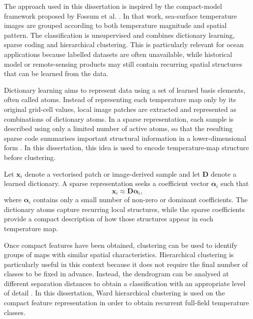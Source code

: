 The approach used in this dissertation is inspired by the compact-model framework proposed by Fossum et al. \cite{fossum2020compact}. In that work, sea-surface temperature images are grouped according to both temperature magnitude and spatial pattern. The classification is unsupervised and combines dictionary learning, sparse coding and hierarchical clustering. This is particularly relevant for ocean applications because labelled datasets are often unavailable, while historical model or remote-sensing products may still contain recurring spatial structures that can be learned from the data.

Dictionary learning aims to represent data using a set of learned basis elements, often called atoms. Instead of representing each temperature map only by its original grid-cell values, local image patches are extracted and represented as combinations of dictionary atoms. In a sparse representation, each sample is described using only a limited number of active atoms, so that the resulting sparse code summarises important structural information in a lower-dimensional form \cite{aharon2006ksvd,mairal2010online}. In this dissertation, this idea is used to encode temperature-map structure before clustering.

Let $\mathbf{x}_i$ denote a vectorised patch or image-derived sample and let $\mathbf{D}$ denote a learned dictionary. A sparse representation seeks a coefficient vector $\boldsymbol{\alpha}_i$ such that
\begin{equation}
\mathbf{x}_i \approx \mathbf{D}\boldsymbol{\alpha}_i,
\end{equation}
where $\boldsymbol{\alpha}_i$ contains only a small number of non-zero or dominant coefficients. The dictionary atoms capture recurring local structures, while the sparse coefficients provide a compact description of how those structures appear in each temperature map.

Once compact features have been obtained, clustering can be used to identify groups of maps with similar spatial characteristics. Hierarchical clustering is particularly useful in this context because it does not require the final number of classes to be fixed in advance. Instead, the dendrogram can be analysed at different separation distances to obtain a classification with an appropriate level of detail \cite{jain1999data,ward1963hierarchical}. In this dissertation, Ward hierarchical clustering is used on the compact feature representation in order to obtain recurrent full-field temperature classes.

